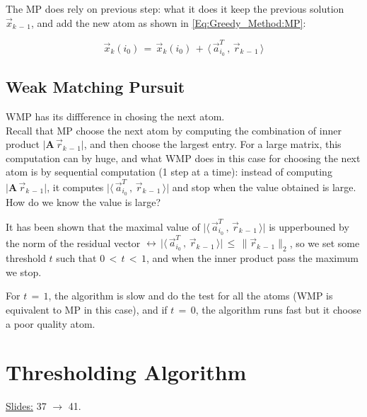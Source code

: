 \documentclass[12pt,a4paper]{book}
\begin{document}
The MP does rely on previous step: what it does it keep the previous solution $\Vec{x}_{k \, - \, 1}$, and add the new atom as shown in \autoref{Eq:Greedy_Method:MP}:

\begin{equation}
    \Vec{x}_k (i_0) \, = \, \Vec{x}_k (i_0) \, + \, \langle  \, \Vec{a}^T_{i_0} \, , \,  \Vec{r}_{k \, - \, 1}  \, \rangle
    \label{Eq:Greedy_Method:MP}
\end{equation}


\subsection{Weak Matching Pursuit}

WMP has its diffference in chosing the next atom.\\

Recall that MP choose the next atom by computing the combination of inner product $\lvert \boldsymbol A \, \Vec{r}_{k \, - \, 1} \rvert$, and then choose the largest entry. For a large matrix, this computation can by huge, and what WMP does in this case for choosing the next atom is by sequential computation (1 step at a time): instead  of computing  $\lvert \boldsymbol A \, \Vec{r}_{k \, - \, 1} \rvert$, it computes $\lvert \langle  \, \Vec{a}^T_{i_0} \, , \,  \Vec{r}_{k \, - \, 1}  \, \rangle \rvert$ and stop when the value obtained is large.\\

How do we know the value is large?

It has been shown that the maximal value of  $\lvert \langle  \, \Vec{a}^T_{i_0} \, , \,  \Vec{r}_{k \, - \, 1}  \, \rangle \rvert$ is upperbouned by the norm of the residual vector $\leftrightarrow \, \lvert \langle  \, \Vec{a}^T_{i_0} \, , \,  \Vec{r}_{k \, - \, 1}  \, \rangle \rvert \, \leq \, \lVert \Vec{r}_{k \, - \, 1} \rVert_2$, so we set some threshold $t$ such that $0 \, < \, t \, < \, 1$, and when the inner product pass the maximum we stop.


For $t \, = \, 1$, the algorithm is slow and do the test for all the atoms (WMP is equivalent to MP in this case), and if $t \, = \, 0$, the algorithm runs fast but it choose a poor quality atom.

\section{Thresholding Algorithm}

\underline{Slides:} 37 $\rightarrow$ 41. \\
\end{document}

